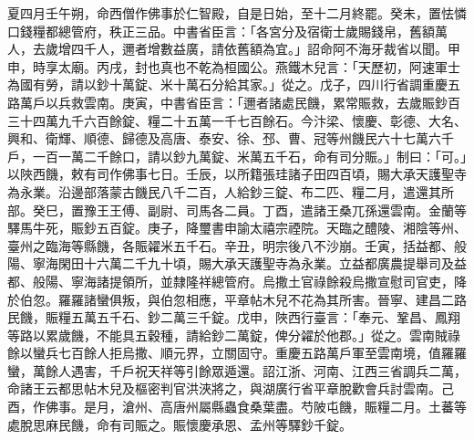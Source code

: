 \begin{pinyinscope}
 夏四月壬午朔，命西僧作佛事於仁智殿，自是日始，至十二月終罷。癸未，置怯憐口錢糧都總管府，秩正三品。中書省臣言：「各宮分及宿衛士歲賜錢帛，舊額萬人，去歲增四千人，邇者增數益廣，請依舊額為宜。」詔命阿不海牙裁省以聞。甲申，時享太廟。丙戌，封也真也不乾為桓國公。燕鐵木兒言：「天歷初，阿速軍士為國有勞，請以鈔十萬錠、米十萬石分給其家。」從之。戊子，四川行省調重慶五路萬戶以兵救雲南。庚寅，中書省臣言：「邇者諸處民饑，累常賑救，去歲賑鈔百三十四萬九千六百餘錠、糧二十五萬一千七百餘石。今汴梁、懷慶、彰德、大名、興和、衛輝、順德、歸德及高唐、泰安、徐、邳、曹、冠等州饑民六十七萬六千戶，一百一萬二千餘口，請以鈔九萬錠、米萬五千石，命有司分賑。」制曰：「可。」以陜西饑，敕有司作佛事七日。壬辰，以所籍張珪諸子田四百頃，賜大承天護聖寺為永業。沿邊部落蒙古饑民八千二百，人給鈔三錠、布二匹、糧二月，遣還其所部。癸巳，置豫王王傅、副尉、司馬各二員。丁酉，遣諸王桑兀孫還雲南。金蘭等驛馬牛死，賑鈔五百錠。庚子，降璽書申諭太禧宗禋院。天臨之醴陵、湘陰等州、臺州之臨海等縣饑，各賑糴米五千石。辛丑，明宗後八不沙崩。壬寅，括益都、般陽、寧海閑田十六萬二千九十頃，賜大承天護聖寺為永業。立益都廣農提舉司及益都、般陽、寧海諸提領所，並隸隆祥總管府。烏撒土官祿餘殺烏撒宣慰司官吏，降於伯忽。羅羅諸蠻俱叛，與伯忽相應，平章帖木兒不花為其所害。晉寧、建昌二路民饑，賑糧五萬五千石、鈔二萬三千錠。戊申，陜西行臺言：「奉元、鞏昌、鳳翔等路以累歲饑，不能具五穀種，請給鈔二萬錠，俾分糴於他郡。」從之。雲南賊祿餘以蠻兵七百餘人拒烏撒、順元界，立關固守。重慶五路萬戶軍至雲南境，值羅羅蠻，萬餘人遇害，千戶祝天祥等引餘眾遁還。詔江浙、河南、江西三省調兵二萬，命諸王云都思帖木兒及樞密判官洪浹將之，與湖廣行省平章脫歡會兵討雲南。己酉，作佛事。是月，滄州、高唐州屬縣蟲食桑葉盡。芍陂屯饑，賑糧二月。土蕃等處脫思麻民饑，命有司賑之。賑懷慶承恩、孟州等驛鈔千錠。




\end{pinyinscope}
